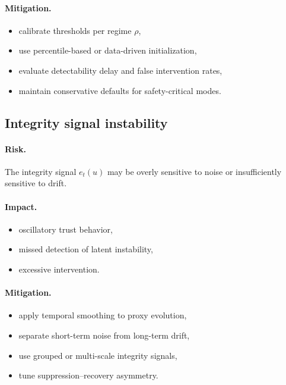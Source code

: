 \documentclass[11pt]{article}
\theoremstyle{definition}
\theoremstyle{plain}
\begin{document}
\paragraph{Mitigation.}
\begin{itemize}[leftmargin=1.5em]
    \item calibrate thresholds per regime $\rho$,
    \item use percentile-based or data-driven initialization,
    \item evaluate detectability delay and false intervention rates,
    \item maintain conservative defaults for safety-critical modes.
\end{itemize}


\subsection{Integrity signal instability}

\paragraph{Risk.}
The integrity signal $e_t(u)$ may be overly sensitive to noise or insufficiently sensitive to drift.

\paragraph{Impact.}
\begin{itemize}[leftmargin=1.5em]
    \item oscillatory trust behavior,
    \item missed detection of latent instability,
    \item excessive intervention.
\end{itemize}

\paragraph{Mitigation.}
\begin{itemize}[leftmargin=1.5em]
    \item apply temporal smoothing to proxy evolution,
    \item separate short-term noise from long-term drift,
    \item use grouped or multi-scale integrity signals,
    \item tune suppression–recovery asymmetry.
\end{itemize}
\end{document}
